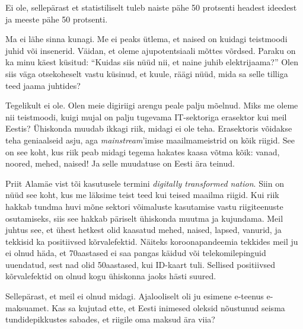 
Ei ole, sellepärast et statistiliselt tuleb naiste pähe 50 protsenti headest 
ideedest ja meeste pähe 50 protsenti.


Ma ei lähe sinna kunagi. Me ei peaks ütlema, 
et naised on kuidagi teistmoodi juhid või insenerid. Väidan, et oleme 
ajupotentsiaali mõttes võrdsed. Paraku on ka minu käest 
küsitud: \enquote{Kuidas siis nüüd nii, et naine juhib elektrijaama?} 
Olen siis väga otsekoheselt vastu küsinud, et kuule, räägi nüüd, 
mida sa selle tilliga teed jaama juhtides? 


Tegelikult ei ole. Olen meie digiriigi arengu peale palju mõelnud. Miks me oleme nii 
teistmoodi, kuigi mujal on palju tugevama IT-sektoriga erasektor kui meil 
Eestis? Ühiskonda muudab ikkagi riik, midagi ei ole teha. 
Erasektoris võidakse teha geniaalseid asju, aga \emph{mainstream}'imise 
maailmameistrid on kõik riigid. See on see koht, kus riik peab midagi 
tegema hakates kaasa võtma kõik: vanad, noored, mehed, naised! Ja 
selle muudatuse on Eesti ära teinud.

Priit Alamäe vist tõi kasutusele termini \emph{digitally transformed nation}. Siin on 
nüüd see koht, kus me läksime teist teed kui teised maailma riigid. Kui 
riik hakkab tundma huvi mõne sektori võimaluste kasutamise vastu 
riigiteenuste osutamiseks, siis see hakkab päriselt ühiskonda muutma 
ja kujundama. Meil juhtus see, et ühest hetkest olid kaasatud 
mehed, naised, lapsed, vanurid, ja tekkisid ka positiivsed kõrvalefektid. Näiteks koroonapandeemia tekkides meil ju ei olnud häda, et 
70aastased ei saa pangas käidud või 
telekomilepinguid uuendatud, sest nad olid 50aastased, kui ID-kaart tuli. Sellised
positiivsed kõrvalefektid on olnud kogu ühiskonna jaoks hästi suured.


Sellepärast, et meil ei olnud midagi. Ajalooliselt oli ju esimene 
\mbox{e-teenus} \mbox{e-maksuamet}. Kas sa kujutad ette, et Eesti inimesed oleksid 
nõustunud seisma tundidepikkustes sabades, et riigile oma maksud ära viia?

